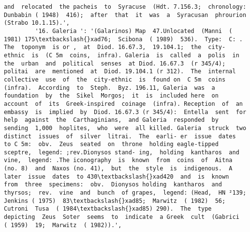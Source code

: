 \documentclass[11pt]{article}
\begin{document}
\begin{Verbatim}[commandchars=\\\{\}]
and  relocated  the pacheis  to  Syracuse  (Hdt. 7.156.3;  chronology:  Dunbabin ( 1948)  416);  after  that  it  was  a  Syracusan  phrourion  (Strabo 10.1.15).',
         '16. Galeria ': '(Galarinos) Map  47.Unlocated  (Manni  ( 1981) 175\textbackslash{}xad76;  Scibona  ( 1989)  536).  Type:  C: .  The  toponym  is or ,  at  Diod. 16.67.3,  19.104.1;  the  city- ethnic  is  (C 5m  coins,  infra). Galeria  is  called  a  polis  in  the  urban  and  political  senses  at Diod. 16.67.3  (r 345/4);  politai  are  mentioned  at  Diod. 19.104.1 (r 312).  The  internal  collective  use  of  the  city-ethnic  is  found on  C 5m  coins  (infra).  According  to  Steph.  Byz. 196.11, Galeria  was  a  foundation  by  the  Sikel  Morgos;  it  is  included here  on  account  of  its  Greek-inspired  coinage  (infra). Reception  of  an  embassy  is  implied  by  Diod. 16.67.3 (r 345/4):  Entella  sent  for  help  against  the  Carthaginians,  and Galeria  responded  by  sending  1,000  hoplites,  who  were  all killed. Galeria  struck  two  distinct  issues  of  silver  litrai.  The  earli- er  issue  dates  to C 5m:  obv.  Zeus  seated  on  throne  holding eagle-tipped  sceptre,  legend: ;rev.Dionysos stand- ing,  holding  kantharos  and  vine,  legend: .The iconography  is  known  from  coins  of  Aitna  (no. 8)  and  Naxos (no. 41),  but  the  style  is  indigenous.  A  later  issue  dates  to 430\textbackslash{}xad420  and  is  known  from  three  specimens:  obv.  Dionysos holding  kantharos  and  thyrsos;  rev.  vine  and  bunch  of grapes,  legend: (Head,  HN ²139;  Jenkins ( 1975)  83\textbackslash{}xad85;  Marwitz  ( 1982)  56;  Cutroni  Tusa  ( 1984\textbackslash{}xad85) 290).  The  type  depicting  Zeus  Soter  seems  to  indicate  a Greek  cult  (Gabrici  ( 1959)  19;  Marwitz  ( 1982)).',

\end{Verbatim}
\end{document}
